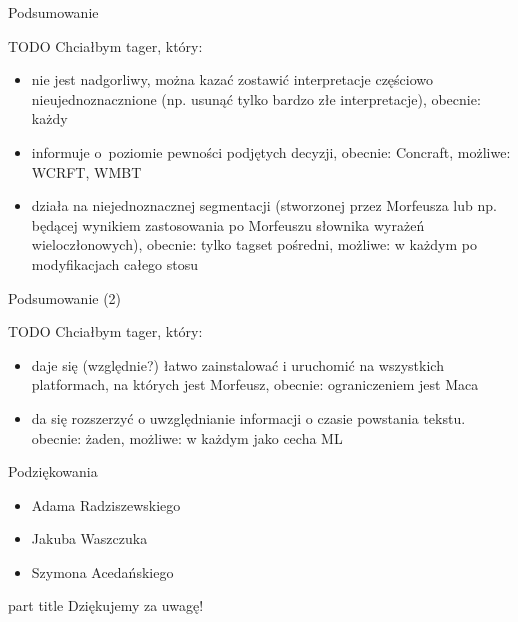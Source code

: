 \documentclass{beamer}
\begin{document}
\begin{frame}{Podsumowanie}
  \vspace{0.5cm}

  TODO Chciałbym tager, który:
   \begin{itemize}
   \item nie jest nadgorliwy, można kazać zostawić interpretacje częściowo nieujednoznacznione (np. usunąć tylko bardzo złe interpretacje),
   obecnie: każdy
   \item informuje o~poziomie pewności podjętych decyzji,
   obecnie: Concraft, możliwe: WCRFT, WMBT
   \item działa na niejednoznacznej segmentacji (stworzonej przez Morfeusza lub np. będącej wynikiem zastosowania po Morfeuszu słownika wyrażeń wieloczłonowych),
   obecnie: tylko tagset pośredni, możliwe: w każdym po modyfikacjach całego stosu
   \end{itemize}
\end{frame}

\begin{frame}{Podsumowanie (2)}
  \vspace{0.5cm}

  TODO Chciałbym tager, który:
   \begin{itemize}
    \item daje się (względnie?) łatwo zainstalować i uruchomić na wszystkich platformach, na których jest Morfeusz,
    obecnie: ograniczeniem jest Maca
    \item da się rozszerzyć o uwzględnianie informacji o czasie powstania tekstu.
    obecnie: żaden, możliwe: w każdym jako cecha ML
  \end{itemize}
\end{frame}

\begin{frame}{Podziękowania}
  \begin{itemize}
    \item Adama Radziszewskiego
    \item Jakuba Waszczuka
    \item Szymona Acedańskiego
  \end{itemize}
\end{frame}

\begin{frame}{}
\begin{centering}
    \begin{beamercolorbox}[sep=12pt,center]{part title}
    Dziękujemy za uwagę!\par
    \end{beamercolorbox}
    \end{centering}
\end{frame}
\end{document}
